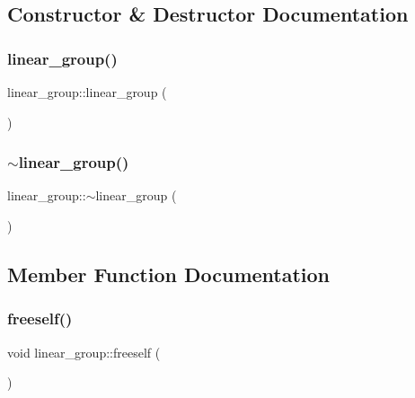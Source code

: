 \subsection{Constructor \& Destructor Documentation}
\mbox{\label{classlinear__group_acbe205533d0f1d8313051fa6f7448165}} 
\subsubsection{\texorpdfstring{linear\+\_\+group()}{linear\_group()}}
{\footnotesize\ttfamily linear\+\_\+group\+::linear\+\_\+group (\begin{DoxyParamCaption}{ }\end{DoxyParamCaption})}

\mbox{\label{classlinear__group_a413afc645f8caf28e0f55c57ada57bf8}} 
\subsubsection{\texorpdfstring{$\sim$linear\+\_\+group()}{~linear\_group()}}
{\footnotesize\ttfamily linear\+\_\+group\+::$\sim$linear\+\_\+group (\begin{DoxyParamCaption}{ }\end{DoxyParamCaption})}



\subsection{Member Function Documentation}
\mbox{\label{classlinear__group_a453d3fd4cc1917a1b8c22bd921bc1500}} 
\subsubsection{\texorpdfstring{freeself()}{freeself()}}
{\footnotesize\ttfamily void linear\+\_\+group\+::freeself (\begin{DoxyParamCaption}{ }\end{DoxyParamCaption})}

